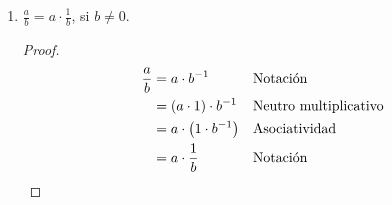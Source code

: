 \documentclass[11pt]{article}
\begin{document}
\begin{enumerate}[label=\alph*)]
    \item $\frac{a}{b}=a\cdot \frac{1}{b}$, si $b\neq 0$.%
    \vspace{-1em}
    \begin{proof} 
    \begin{align*}
        \frac{a}{b} &= a\cdot b^{-1} && \text{Notación}\\
        &= (a\cdot 1) \cdot b^{-1} && \text{Neutro multiplicativo}\\
        &= a\cdot \bigl(1\cdot b^{-1}\bigr) && \text{Asociatividad}\\
        &= a\cdot \frac{1}{b} && \text{Notación} \qedhere
    \end{align*}
    \end{proof} \vspace{-1em}


\end{enumerate}
\end{document}
